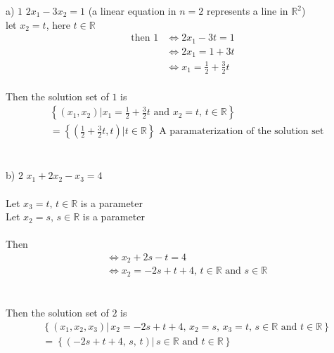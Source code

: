 \documentclass{jhwhw}
\begin{document}
a) \(\boxed{1}\) \(2x_1 - 3x_2 = 1\) (a linear equation in \(n=2\) represents a line in \(\mathbb{R} ^2\))
\\
let \(x_2=t\), here \(t \in \mathbb{R}\)
\\

\begin{align*} 
\text{then } \boxed{1} &\Leftrightarrow 2x_1 - 3t = 1 \\
&\Leftrightarrow 2x_1 = 1 + 3t \\
&\Leftrightarrow x_1 = \frac{1}{2} + \frac{3}{2}t \\
\end{align*}

Then the solution set of \(\boxed{1}\) is 
\\
\begin{align*} 
    &\left\{(x_1 , x_2) | x_1 = \frac{1}{2} + \frac{3}{2}t \text{ and } x_2 = t \text{, } t \in \mathbb{R} \right\}\\
    &\boxed{= \left\{\left(\frac{1}{2} + \frac{3}{2}t, t\right) | t \in \mathbb{R} \right\}} \text{ A paramaterization of the solution set}\end{align*}
\\ \\

b) \(\boxed{2}\) \(x_1 + 2x_2 - x_3 = 4\)\\ \\
Let \(x_3=t, \, t \in \mathbb{R}\) is a parameter \\
Let \(x_2 = s, \, s \in \mathbb{R}\) is a parameter
\\ \\
Then \\
\begin{align*}  
    &\Leftrightarrow x_2 + 2s - t = 4 \\
    &\Leftrightarrow x_2 = -2s + t + 4, \, t \in \mathbb{R} \text{ and } s \in \mathbb{R}
\end{align*}
\\ \\
Then the solution set of \(\boxed{2}\) is
\begin{align*}
&\left\{(x_1, x_2, x_3) | \, x_2 = -2s +t +4, \,x_2 =s, \,x_3 =t, \,s \in \mathbb{R} \text{ and } t \in \mathbb{R} \right\}\\
&\boxed{= \left\{(-2s+t+4,\, s,\, t) | \,s \in \mathbb{R} \text{ and }t \in \mathbb{R} \right\}}
\end{align*}
\\ \\
\end{document}
